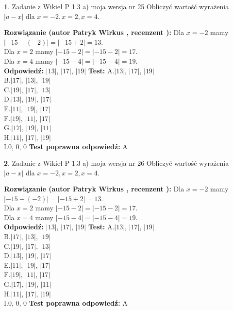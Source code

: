 \documentclass[12pt, a4paper]{article}
\theoremstyle{definition} %
\newtheorem{zad}{}
\newcommand{\zadStart}[1]{\begin{zad}#1\newline}
\newcommand{\zadStop}{\end{zad}}
\newcommand{\rozwStart}[2]{\noindent \textbf{Rozwiązanie (autor #1 , recenzent #2): }\newline}
\newcommand{\rozwStop}{\newline}
\newcommand{\odpStart}{\noindent \textbf{Odpowiedź:}\newline}
\newcommand{\odpStop}{\newline}
\newcommand{\testStart}{\noindent \textbf{Test:}\newline}
\newcommand{\testStop}{\newline}
\newcommand{\kluczStart}{\noindent \textbf{Test poprawna odpowiedź:}\newline}
\newcommand{\kluczStop}{\newline}
\begin{document}
\zadStart{Zadanie z Wikieł P 1.3 a) moja wersja nr 25}
Obliczyć wartość wyrażenia $|a - x|$ dla $x=-2,x=2,x=4$.
\zadStop
\rozwStart{Patryk Wirkus}{}
Dla $x = -2$ mamy $|-15 - (-2)| = |-15 + 2| = 13$.\\
Dla $x = 2$ mamy $|-15 - 2| = |-15 - 2| = 17$.\\
Dla $x = 4$ mamy $|-15 - 4| = |-15 - 4| = 19$.\\
\rozwStop
\odpStart
$|13|$, $|17|$, $|19|$
\odpStop
\testStart
A.$|13|$, $|17|$, $|19|$\\
B.$|17|$, $|13|$, $|19|$\\
C.$|19|$, $|17|$, $|13|$\\
D.$|13|$, $|19|$, $|17|$\\
E.$|11|$, $|19|$, $|17|$\\
F.$|19|$, $|11|$, $|17|$\\
G.$|17|$, $|19|$, $|11|$\\
H.$|11|$, $|17|$, $|19|$\\
I.$0$, $0$, $0$
\testStop
\kluczStart
A
\kluczStop



\zadStart{Zadanie z Wikieł P 1.3 a) moja wersja nr 26}
Obliczyć wartość wyrażenia $|a - x|$ dla $x=-2,x=2,x=4$.
\zadStop
\rozwStart{Patryk Wirkus}{}
Dla $x = -2$ mamy $|-15 - (-2)| = |-15 + 2| = 13$.\\
Dla $x = 2$ mamy $|-15 - 2| = |-15 - 2| = 17$.\\
Dla $x = 4$ mamy $|-15 - 4| = |-15 - 4| = 19$.\\
\rozwStop
\odpStart
$|13|$, $|17|$, $|19|$
\odpStop
\testStart
A.$|13|$, $|17|$, $|19|$\\
B.$|17|$, $|13|$, $|19|$\\
C.$|19|$, $|17|$, $|13|$\\
D.$|13|$, $|19|$, $|17|$\\
E.$|11|$, $|19|$, $|17|$\\
F.$|19|$, $|11|$, $|17|$\\
G.$|17|$, $|19|$, $|11|$\\
H.$|11|$, $|17|$, $|19|$\\
I.$0$, $0$, $0$
\testStop
\kluczStart
A
\kluczStop
\end{document}
